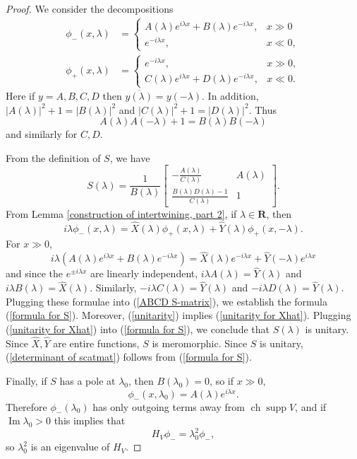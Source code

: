\documentclass[12pt]{report}
\newcommand{\RR}{\mathbf{R}}
\DeclareMathOperator{\ch}{ch}
\DeclareMathOperator{\supp}{supp}
\renewcommand{\Im}{\operatorname{Im}}
\theoremstyle{definition}
\begin{document}
\begin{proof}
We consider the decompositions
\begin{align*}
\phi_-(x, \lambda) &= \begin{cases}
A(\lambda)e^{i\lambda x} + B(\lambda) e^{-i\lambda x}, &x \gg 0\\
e^{-i\lambda x}, & x \ll 0,
\end{cases}\\
\phi_+(x, \lambda) &= \begin{cases}
e^{-i\lambda x}, & x \gg 0,\\
C(\lambda) e^{i\lambda x} + D(\lambda) e^{-i\lambda x}, &x \ll 0.
\end{cases}\end{align*}
Here if $y = A,B,C,D$ then $\overline{y(\lambda)} = y(-\lambda)$. In addition, $|A(\lambda)|^2 + 1 = |B(\lambda)|^2$ and $|C(\lambda)|^2 + 1 = |D(\lambda)|^2$.
Thus
\begin{equation}
\label{unitarity}
A(\lambda)A(-\lambda) + 1 = B(\lambda)B(-\lambda)
\end{equation}
and similarly for $C,D$.

From the definition of $S$, we have
\begin{equation}
\label{ABCD S-matrix}
S(\lambda) = \frac{1}{B(\lambda)}\begin{bmatrix}
-\frac{A(\lambda)}{C(\lambda)} & A(\lambda)\\
\frac{B(\lambda)D(\lambda)-1}{C(\lambda)} & 1
\end{bmatrix}.
\end{equation}
From Lemma \ref{construction of intertwining, part 2}, if $\lambda \in \RR$, then
$$i\lambda \phi_-(x, \lambda) = \hat X(\lambda) \phi_+(x, \lambda) + \hat Y(\lambda) \phi_+(x, -\lambda).$$
For $x \gg 0$,
$$i\lambda(A(\lambda) e^{i\lambda x} + B(\lambda)e^{-i\lambda x}) = \hat X(\lambda) e^{-i\lambda x} + \hat Y(-\lambda) e^{i\lambda x}$$
and since the $e^{\pm i\lambda x}$ are linearly independent, $i\lambda A(\lambda) = \hat Y(\lambda)$ and $i\lambda B(\lambda) = \hat X(\lambda)$.
Similarly, $-i\lambda C(\lambda) = \hat Y(\lambda)$ and $-i\lambda D(\lambda) = \hat Y(\lambda)$. Plugging these formulae into (\ref{ABCD S-matrix}), we establish the formula (\ref{formula for S}).
Moreover, (\ref{unitarity}) implies (\ref{unitarity for Xhat}). Plugging (\ref{unitarity for Xhat}) into (\ref{formula for S}), we conclude that $S(\lambda)$ is unitary. Since $\hat X, \hat Y$ are entire functions, $S$ is meromorphic.
Since $S$ is unitary, (\ref{determinant of scatmat}) follows from (\ref{formula for S}).

Finally, if $S$ has a pole at $\lambda_0$, then $B(\lambda_0) = 0$, so if $x \gg 0$,
$$\phi_-(x, \lambda_0) = A(\lambda)e^{i\lambda x}.$$
Therefore $\phi_-(\lambda_0)$ has only outgoing terms away from $\ch \supp V$, and if $\Im \lambda_0 > 0$ this implies that
$$H_V\phi_- = \lambda_0^2\phi_-,$$
so $\lambda_0^2$ is an eigenvalue of $H_V$.
\end{proof}
\end{document}
